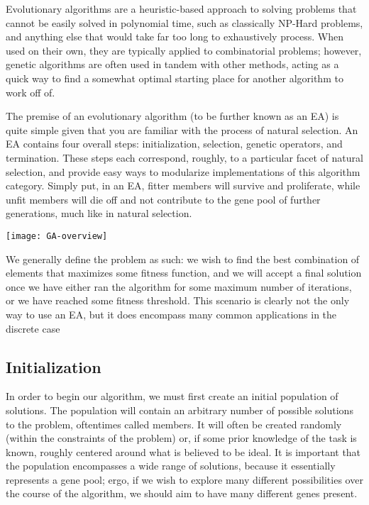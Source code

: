 Evolutionary algorithms are a heuristic-based approach to solving problems that cannot be easily solved in polynomial time, such as classically NP-Hard problems, and anything else that would take far too long to exhaustively process. When used on their own, they are typically applied to combinatorial problems; however, genetic algorithms are often used in tandem with other methods, acting as a quick way to find a somewhat optimal starting place for another algorithm to work off of.

The premise of an evolutionary algorithm (to be further known as an EA) is quite simple given that you are familiar with the process of natural selection. An EA contains four overall steps: initialization, selection, genetic operators, and termination. These steps each correspond, roughly, to a particular facet of natural selection, and provide easy ways to modularize implementations of this algorithm category. Simply put, in an EA, fitter members will survive and proliferate, while unfit members will die off and not contribute to the gene pool of further generations, much like in natural selection.

\begin{marginfigure}
\texttt{[image: GA-overview]}
\end{marginfigure}

We generally define the problem as such: we wish to find the best combination of elements that maximizes some fitness function, and we will accept a final solution once we have either ran the algorithm for some maximum number of iterations, or we have reached some fitness threshold. This scenario is clearly not the only way to use an EA, but it does encompass many common applications in the discrete case

\subsection{Initialization}
In order to begin our algorithm, we must first create an initial population of solutions. The population will contain an arbitrary number of possible solutions to the problem, oftentimes called members. It will often be created randomly (within the constraints of the problem) or, if some prior knowledge of the task is known, roughly centered around what is believed to be ideal. It is important that the population encompasses a wide range of solutions, because it essentially represents a gene pool; ergo, if we wish to explore many different possibilities over the course of the algorithm, we should aim to have many different genes present.

